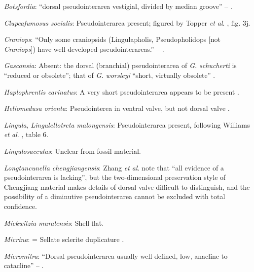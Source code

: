 \documentclass[openany]{book}
\begin{document}
\hypertarget{Botsfordia-coding-92}{}
\emph{Botsfordia}: ``dorsal pseudointerarea vestigial, divided by median
groove'' -- \citet{Williams2000LinguliformeaCraniiformea}.

\hypertarget{Clupeafumosus_socialis-coding-92}{}
\emph{Clupeafumosus socialis}: Pseudointerarea present; figured by
Topper \emph{et al}. \citeyearpar{Topper2013Reappraisalof}, fig. 3j.

\hypertarget{Craniops-coding-92}{}
\emph{Craniops}: ``Only some craniopsids (Lingulapholis, Pseudopholidops
{[}not \emph{Craniops}{]}) have well-developed pseudointerareas.'' --
\citet{Williams2000LinguliformeaCraniiformea}.

\hypertarget{Gasconsia-coding-92}{}
\emph{Gasconsia}: Absent: the dorsal (branchial) pseudointerarea of
\emph{G. schucherti} is ``reduced or obsolete''; that of \emph{G.
worsleyi} ``short, virtually obsolete'' \citep{Hanken1985Thetaxonomy}.

\hypertarget{Haplophrentis_carinatus-coding-92}{}
\emph{Haplophrentis carinatus}: A very short pseudointerarea appears to
be present \citep{Moysiuk2017Hyolithsare}.

\hypertarget{Heliomedusa_orienta-coding-92}{}
\emph{Heliomedusa orienta}: Pseudointerea in ventral valve, but not
dorsal valve \citep[2007]{Williams2000LinguliformeaCraniiformea}.

\hypertarget{Lingula-coding-92}{}
\emph{Lingula}, \emph{Lingulellotreta malongensis}: Pseudointerarea
present, following Williams \emph{et al}.
\citeyearpar{Williams2000LinguliformeaCraniiformea}, table 6.

\hypertarget{Lingulosacculus-coding-92}{}
\emph{Lingulosacculus}: Unclear from fossil material.

\hypertarget{Longtancunella_chengjiangensis-coding-92}{}
\emph{Longtancunella chengjiangensis}: Zhang \emph{et al}.
\citeyearpar{Zhang2011Theexceptionally} note that ``all evidence of a
pseudointerarea is lacking'', but the two-dimensional preservation style
of Chengjiang material makes details of dorsal valve difficult to
distinguish, and the possibility of a diminutive pseudointerarea cannot
be excluded with total confidence.

\hypertarget{Mickwitzia_muralensis-coding-92}{}
\emph{Mickwitzia muralensis}: Shell flat.

\hypertarget{Micrina-coding-92}{}
\emph{Micrina}: = Sellate sclerite duplicature
\citep{Holmer2008TheEarly}.

\hypertarget{Micromitra-coding-92}{}
\emph{Micromitra}: ``Dorsal pseudointerarea usually well defined, low,
anacline to catacline'' --
\citet{Williams2000LinguliformeaCraniiformea}.
\end{document}
